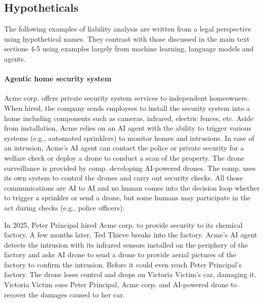 \documentclass[11pt]{article}
\begin{document}
\subsection{Hypotheticals}
\label{app:hypothete}
The following examples of liability analysis are written from a legal perspective using hypothetical names. They contrast with those discussed in the main text sections 4-5 using examples largely from machine learning, language models and agents.

\paragraph{Agentic home security system} Acme corp. offers private security system services to independent homeowners.  When hired, the company sends employees to install the security system into a home including components such as cameras, infrared, electric fences, etc.  Aside from installation, Acme relies on an AI agent with the ability to trigger various systems (e.g., automated sprinklers) to monitor homes and intrusions.  In case of an intrusion, Acme's AI agent can contact the police or private security for a welfare check or deploy a drone to conduct a scan of the property. The drone surveillance is provided by comp. developing AI-powered drones. The comp. uses its own system to control the drones and carry out security checks. All those communications are AI to AI and no human comes into the decision loop whether to trigger a sprinkler or send a drone, but some humans may participate in the act during checks (e.g., police officers).  

In 2025, Peter Principal hired Acme corp. to provide security to its chemical factory.  A few months later, Ted Thieve breaks into the factory.  Acme's AI agent detects the intrusion with its infrared sensors installed on the periphery of the factory and asks AI drone to send a drone to provide aerial pictures of the factory to confirm the intrusion.  Before it could even reach Peter Principal's factory.  The drone loses control and drops on Victoria Victim's car, damaging it.  Victoria Victim sues Peter Principal, Acme corp. and AI-powered drone to recover the damages caused to her car.
\end{document}
